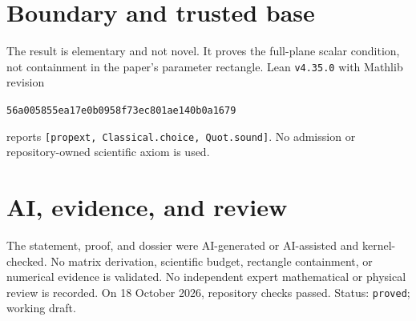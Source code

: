 \documentclass[11pt]{article}
\begin{document}
\section{Boundary and trusted base}
The result is elementary and not novel. It proves the full-plane scalar condition, not
containment in the paper's parameter rectangle. Lean \texttt{v4.35.0} with Mathlib
revision
\begin{center}\texttt{56a005855ea17e0b0958f73ec801ae140b0a1679}\end{center}
reports \texttt{[propext, Classical.choice, Quot.sound]}. No admission or
repository-owned scientific axiom is used.

\section{AI, evidence, and review}
The statement, proof, and dossier were AI-generated or AI-assisted and kernel-checked.
No matrix derivation, scientific budget, rectangle containment, or numerical evidence is
validated. No independent expert mathematical or physical review is recorded. On 18
October 2026, repository checks passed. Status: \texttt{proved}; working draft.
\end{document}
